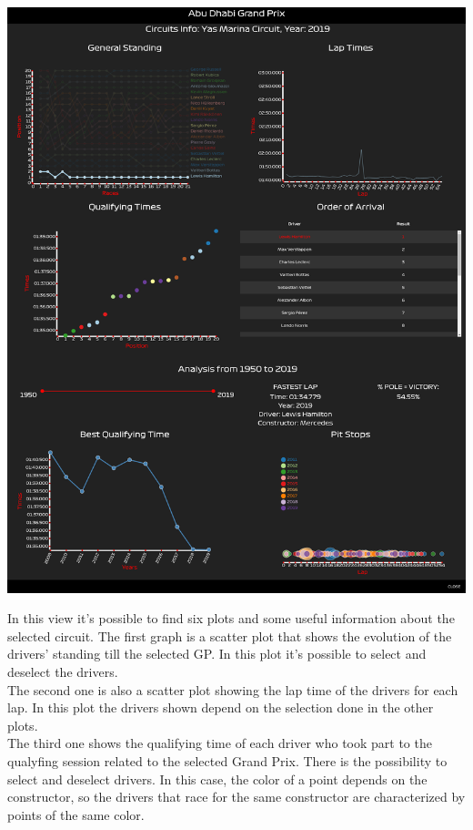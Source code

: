\documentclass[11pt,twocolumn,letterpaper]{article}
\begin{document}
\begin{center}
	\centering
	\includegraphics[width=\columnwidth]{map-clicked}
\end{center}
In this view it's possible to find six plots and some useful information about the selected circuit.
The first graph is a scatter plot that shows the evolution of the drivers' standing till the selected GP. In this plot it's possible to select and deselect the drivers. \\
The second one is also a scatter plot showing the lap time of the drivers for each lap. In this plot the drivers shown depend on the selection done in the other plots.\\
The third one shows the qualifying time of each driver who took part to the qualyfing session related to the selected Grand Prix. There is the possibility to select and deselect drivers. In this case, the color of a point depends on the constructor, so the drivers that race for the same constructor are characterized by points of the same color.\\
\end{document}
